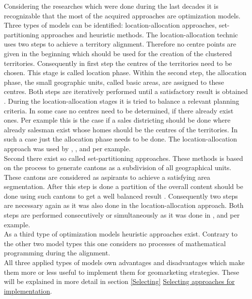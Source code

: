 Considering the researches which were done during the last decades it is recognizable that the most of the acquired approaches are optimization models. Three types of models can be identified: location-allocation approaches, set-partitioning approaches and heuristic methods. The location-allocation technic uses two steps to achieve a territory alignment. Therefore no centre points are given in the beginning which should be used for the creation of the clustered territories. Consequently in first step the centres of the territories need to be chosen. This stage is called location phase. Within the second step, the allocation phase, the small geographic units, called basic areas, are assigned to these centres. Both steps are iteratively performed until a satisfactory result is obtained \cite{kalcsics}. During the location-allocation stages it is tried to balance a relevant planning criteria. In some case no centres need to be determined, if there already exist ones. Per example this is the case if a sales districting should be done where already salesman exist whose homes should be the centres of the territories. In such a case just the allocation phase needs to be done. The location-allocation approach was used by \citeauthor{hessstuart}\cite{hessstuart}, \citeauthor{zoltner}\cite{zoltner},\citeauthor{george}\cite{george} and \citeauthor{schroeder}\cite{schroeder} per example.\\
Second there exist so called set-partitioning approaches. These methods is based on the process to generate cantons as a subdivision of all geographical units. These cantons are considered as aspirants to achieve a satisfying area segmentation. After this step is done a partition of the overall content should be done using such cantons to get a well balanced result \cite{schroeder}. Consequently two steps are necessary again as it was also done in the location-allocation approach. Both steps are performed consecutively or simultaneously as it was done in \citeauthor{garfinkel}\cite{garfinkel}, \citeauthor{nygreen}\cite{nygreen} and \citeauthor{mehrotra}\cite{mehrotra} per example. \\
As a third type of optimization models heuristic approaches exist. Contrary to the other two model types this one considers no processes of mathematical programming during the alignment. \\
All three applied types of models own advantages and disadvantages which make them more or less useful to implement them for geomarketing strategies. These will be explained in more detail in section \ref{Selecting} \hyperref[Selecting]{Selecting approaches for implementation}.


